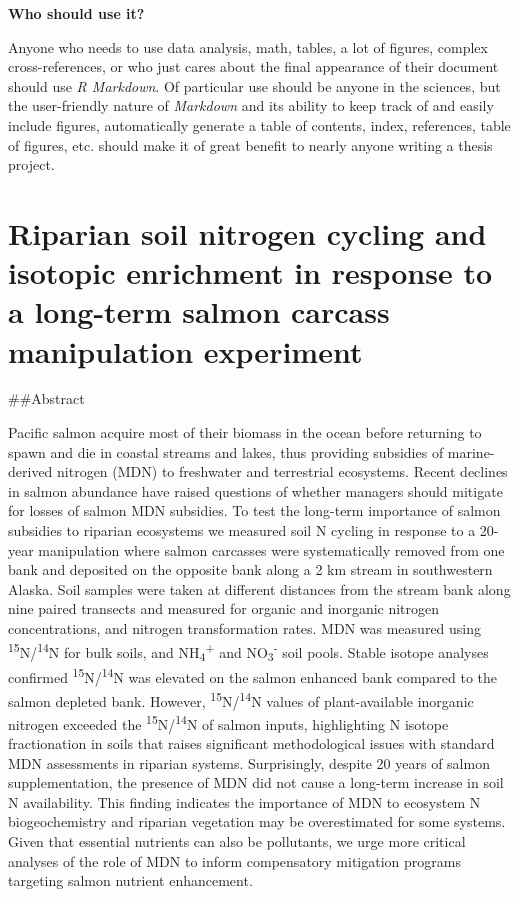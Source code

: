 \documentclass [11pt, proquest] {uwthesis}[2015/03/03]
\begin{document}
\textbf{Who should use it?}

Anyone who needs to use data analysis, math, tables, a lot of figures, complex cross-references, or who just cares about the final appearance of their document should use \emph{R Markdown}. Of particular use should be anyone in the sciences, but the user-friendly nature of \emph{Markdown} and its ability to keep track of and easily include figures, automatically generate a table of contents, index, references, table of figures, etc. should make it of great benefit to nearly anyone writing a thesis project.

\hypertarget{riparian-soil-nitrogen-cycling-and-isotopic-enrichment-in-response-to-a-long-term-salmon-carcass-manipulation-experiment}{%
\chapter{Riparian soil nitrogen cycling and isotopic enrichment in response to a long-term salmon carcass manipulation experiment}\label{riparian-soil-nitrogen-cycling-and-isotopic-enrichment-in-response-to-a-long-term-salmon-carcass-manipulation-experiment}}

\#\#Abstract

Pacific salmon acquire most of their biomass in the ocean before returning to spawn and die in coastal streams and lakes, thus providing subsidies of marine-derived nitrogen (MDN) to freshwater and terrestrial ecosystems. Recent declines in salmon abundance have raised questions of whether managers should mitigate for losses of salmon MDN subsidies. To test the long-term importance of salmon subsidies to riparian ecosystems we measured soil N cycling in response to a 20-year manipulation where salmon carcasses were systematically removed from one bank and deposited on the opposite bank along a 2 km stream in southwestern Alaska. Soil samples were taken at different distances from the stream bank along nine paired transects and measured for organic and inorganic nitrogen concentrations, and nitrogen transformation rates. MDN was measured using \textsuperscript{15}N/\textsuperscript{14}N for bulk soils, and NH\textsubscript{4}\textsuperscript{+} and NO\textsubscript{3}\textsuperscript{-} soil pools. Stable isotope analyses confirmed \textsuperscript{15}N/\textsuperscript{14}N was elevated on the salmon enhanced bank compared to the salmon depleted bank. However, \textsuperscript{15}N/\textsuperscript{14}N values of plant-available inorganic nitrogen exceeded the \textsuperscript{15}N/\textsuperscript{14}N of salmon inputs, highlighting N isotope fractionation in soils that raises significant methodological issues with standard MDN assessments in riparian systems. Surprisingly, despite 20 years of salmon supplementation, the presence of MDN did not cause a long-term increase in soil N availability. This finding indicates the importance of MDN to ecosystem N biogeochemistry and riparian vegetation may be overestimated for some systems. Given that essential nutrients can also be pollutants, we urge more critical analyses of the role of MDN to inform compensatory mitigation programs targeting salmon nutrient enhancement.
\end{document}
